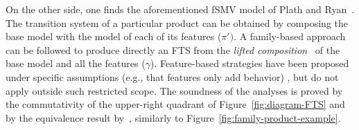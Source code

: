 On the other side, one finds the aforementioned fSMV model of Plath and Ryan~\cite{Plath2001}. The transition system of a particular product can be obtained by composing the base model with the model of each of its features ($\pi')$. A family-based approach can be followed to produce directly an FTS from the \emph{lifted composition}~\cite{Classen2014} of the base model and all the features ($\gamma$). Feature-based strategies have been proposed under specific assumptions (e.g., that features only add behavior) \cite{Cordy2012}, but do not apply outside such restricted scope. 
The soundness of the analyses is proved by the commutativity of the upper-right quadrant of Figure~\ref{fig:diagram-FTS} and by the equivalence result by~\citet{Classen2014}, similarly to Figure~\ref{fig:family-product-example}.

%
%
%
